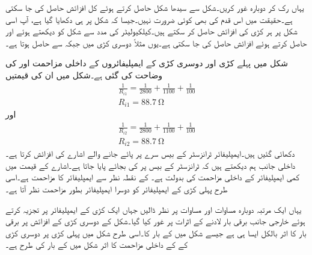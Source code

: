 یہاں رک کر دوبارہ غور کریں۔شکل  سے  سیدھا شکل  حاصل کرتے ہوئے کل افزائش حاصل کی جا سکتی ہے۔حقیقت میں اس قدم کی بھی کوئی ضرورت نہیں۔جیسا کہ شکل  پر ہی دکھایا گیا ہے، آپ اسی شکل پر ہر کڑی کی افزائش  حاصل کر سکتے ہیں۔کیلکیولیٹر کی مدد سے شکل کو دیکھتے ہوئے  اور  حاصل کرتے ہوئے افزائش حاصل کی جا سکتی ہے۔یوں مثلاً دوسری کڑی میں  جبکہ  سے  حاصل ہوتا ہے۔

شکل  میں پہلے کڑی اور دوسری کڑی کے ایمپلیفائروں کے داخلی مزاحمت  اور  کی وضاحت کی گئی ہے۔شکل  میں ان کی قیمتیں
\begin{align*}
\frac{1}{R_{i1}}=\frac{1}{2800}+\frac{1}{1100}+\frac{1}{100}\\
R_{i1}=\SI{88.7}{\ohm}
\end{align*}
اور 
\begin{align*}
\frac{1}{R_{i2}}=\frac{1}{2800}+\frac{1}{1100}+\frac{1}{100}\\
R_{i2}=\SI{88.7}{\ohm}
\end{align*}
دکھائی گئیں ہیں۔ایمپلیفائر ٹرانزسٹر کے بیس سرے پر پائے جانے والے اشارے کی افزائش کرتا ہے۔داخلی جانب ہم دیکھتے ہیں کہ ٹرانزسٹر کے بیس پر  کی بجائے  پایا جاتا ہے۔اشارے کے قیمت میں کمی ایمپلیفائر کے داخلی مزاحمت  کی بدولت ہے۔ کے نقطہ نظر سے ایمپلیفائر  کا مزاحمت ہے۔اسی طرح پہلی کڑی کے ایمپلیفائر کو دوسرا ایمپلیفائر بطور مزاحمت  نظر آتا ہے۔

یہاں ایک مرتبہ دوبارہ مساوات  اور مساوات  پر نظر ڈالیں جہاں ایک کڑی کے ایمپلیفائر پر تجزیہ کرتے ہوئے خارجی جانب برقی بار لادنے کے اثرات پر غور کیا گیا۔شکل  کے دوسری کڑی کے افزائش پر  برقی بار کا اثر بالکل ایسا ہی ہے جیسے شکل  میں  کے بار کا۔اسی طرح شکل  میں پہلی کڑی پر دوسری کڑی کے   کے داخلی مزاحمت کا اثر شکل  میں  کے بار کی طرح ہے۔  

